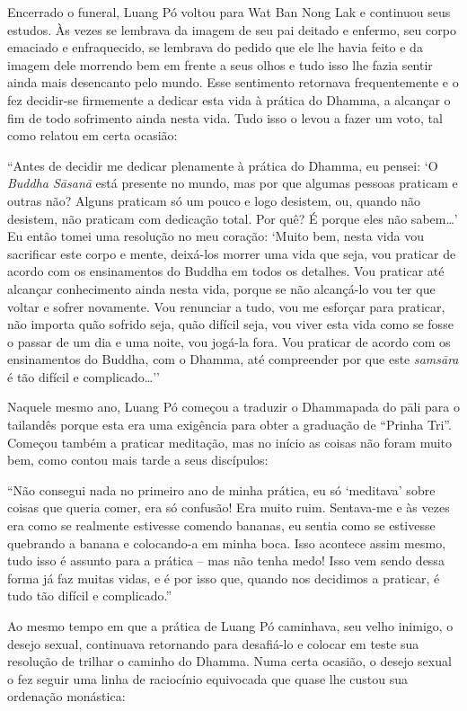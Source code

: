 Encerrado o funeral, Luang Pó voltou para Wat Ban Nong Lak e continuou
seus estudos. Às vezes se lembrava da imagem de seu pai deitado e
enfermo, seu corpo emaciado e enfraquecido, se lembrava do pedido que
ele lhe havia feito e da imagem dele morrendo bem em frente a seus olhos
e tudo isso lhe fazia sentir ainda mais desencanto pelo mundo. Esse
sentimento retornava frequentemente e o fez decidir-se firmemente a
dedicar esta vida à prática do Dhamma, a alcançar o fim de todo
sofrimento ainda nesta vida. Tudo isso o levou a fazer um voto, tal como
relatou em certa ocasião:

``Antes de decidir me dedicar plenamente à prática do Dhamma, eu pensei:
`O \emph{Buddha Sāsanā} está presente no mundo, mas por que
algumas pessoas praticam e outras não? Alguns praticam só um pouco e
logo desistem, ou, quando não desistem, não praticam com dedicação
total. Por quê? É porque eles não sabem\ldots{}' Eu então tomei uma
resolução no meu coração: `Muito bem, nesta vida vou sacrificar este
corpo e mente, deixá-los morrer uma vida que seja, vou praticar de
acordo com os ensinamentos do Buddha em todos os detalhes. Vou praticar
até alcançar conhecimento ainda nesta vida, porque se não alcançá-lo vou
ter que voltar e sofrer novamente. Vou renunciar a tudo, vou me esforçar
para praticar, não importa quão sofrido seja, quão difícil seja, vou
viver esta vida como se fosse o passar de um dia e uma noite, vou
jogá-la fora. Vou praticar de acordo com os ensinamentos do Buddha, com
o Dhamma, até compreender por que este \emph{samsāra} é tão difícil e
complicado\ldots{}''

Naquele mesmo ano, Luang Pó começou a traduzir o Dhammapada do pāli para
o tailandês porque esta era uma exigência para obter a graduação de
``Prinha Tri''. Começou também a praticar meditação, mas no início as
coisas não foram muito bem, como contou mais tarde a seus discípulos:

``Não consegui nada no primeiro ano de minha prática, eu só `meditava'
sobre coisas que queria comer, era só confusão! Era muito ruim.
Sentava-me e às vezes era como se realmente estivesse comendo bananas,
eu sentia como se estivesse quebrando a banana e colocando-a em minha
boca. Isso acontece assim mesmo, tudo isso é assunto para a prática --
mas não tenha medo! Isso vem sendo dessa forma já faz muitas vidas, e é
por isso que, quando nos decidimos a praticar, é tudo tão difícil e
complicado.''

Ao mesmo tempo em que a prática de Luang Pó caminhava, seu velho
inimigo, o desejo sexual, continuava retornando para desafiá-lo e
colocar em teste sua resolução de trilhar o caminho do Dhamma. Numa
certa ocasião, o desejo sexual o fez seguir uma linha de raciocínio
equivocada que quase lhe custou sua ordenação monástica:


